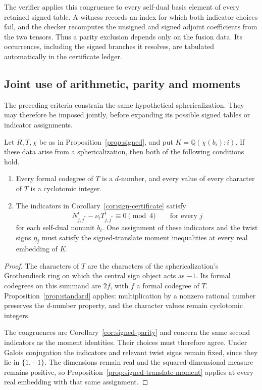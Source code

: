 The verifier applies this congruence to every self-dual basis element
of every retained signed table. A witness records an index for which
both indicator choices fail, and the checker recomputes the unsigned
and signed adjoint coefficients from the two tensors. Thus a parity
exclusion depends only on the fusion data. Its occurrences, including
the signed branches it resolves, are tabulated automatically in the
certificate ledger.

\subsection{Joint use of arithmetic, parity and moments}
The preceding criteria constrain the same hypothetical sphericalization.
They may therefore be imposed jointly, before expanding its possible
signed tables or indicator assignments.

\begin{corollary}
\label{cor:joint-signed-conditions}
Let $R,T,\chi$ be as in Proposition~\ref{prop:signed}, and put
$K=\mathbb Q(\chi(b_i):i)$. If these data arise from a
sphericalization, then both of the following conditions hold.
\begin{enumerate}
\item Every formal codegree of $T$ is a $d$-number, and every value
of every character of $T$ is a cyclotomic integer.
\item The indicators in Corollary~\ref{cor:sign-certificate} satisfy
\[
 N_{j,j^*}^{i}-\nu_iT_{j,j^*}^{i}\equiv0\pmod4
 \qquad\text{for every }j
\]
for each self-dual nonunit $b_i$. One assignment of these indicators
and the twist signs $\eta_j$ must satisfy the signed-translate
moment inequalities at every real embedding of $K$.
\end{enumerate}
\end{corollary}
\begin{proof}
The characters of $T$ are the characters of the sphericalization's
Grothendieck ring on which the central sign object acts as $-1$.
Its formal codegrees on this summand are $2f$, with $f$ a formal
codegree of $T$. Proposition~\ref{prop:standard} applies:
multiplication by a nonzero rational number preserves the
$d$-number property, and the character values remain cyclotomic
integers.

The congruences are Corollary~\ref{cor:signed-parity} and concern
the same second indicators as the moment identities. Their choices
must therefore agree. Under Galois conjugation the indicators and
relevant twist signs remain fixed, since they lie in $\{1,-1\}$.
The dimensions remain real and the squared-dimensional measure
remains positive, so Proposition~\ref{prop:signed-translate-moment}
applies at every real embedding with that same assignment.
\end{proof}

